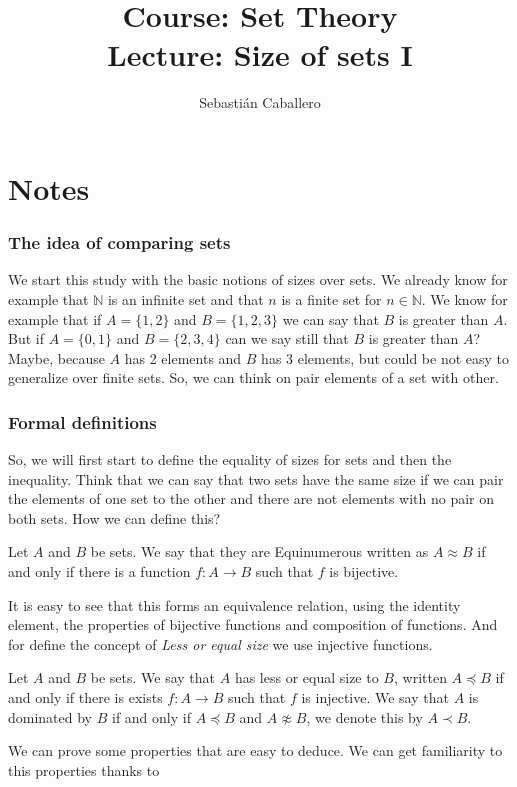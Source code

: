 \documentclass{tufte-handout}
\title{Course: Set Theory \\ \Large Lecture: Size of sets I}
\author{Sebastián Caballero}
\begin{document}
\maketitle



\part*{Notes}
\section{The idea of comparing sets}
We start this study with the basic notions of sizes over sets. We already know for example that $\mathbb{N}$ is an infinite set and that $n$ is a finite set for $n \in \mathbb{N}$. We know for example that if $A = \{1, 2\}$ and $B = \{1, 2, 3\}$ we can say that $B$ is greater than $A$. \\

But if $A = \{0, 1\}$ and $B = \{2, 3, 4\}$ can we say still that $B$ is greater than $A$? Maybe, because $A$ has 2 elements and $B$ has $3$ elements, but could be not easy to generalize over finite sets. So, we can think on pair elements of a set with other.

\section{Formal definitions}
So, we will first start to define the equality of sizes for sets and then the inequality. Think that we can say that two sets have the same size if we can pair the elements of one set to the other and there are not elements with no pair on both sets. How we can define this?

\begin{definition}
	Let $A$ and $B$ be sets. We say that they are Equinumerous written as $A \approx B$ if and only if there is a function $f: A \to B$ such that $f$ is bijective.
\end{definition}

It is easy to see that this forms an equivalence relation, using the identity element, the properties of bijective functions and composition of functions. And for define the concept of \textit{Less or equal size} we use injective functions.

\begin{definition}
	Let $A$ and $B$ be sets. We say that $A$ has less or equal size to $B$, written $A \preceq B$ if and only if there is exists $f: A \to B$ such that $f$ is injective. We say that $A$ is dominated by $B$ if and only if $A \preceq B$ and $A \not \approx B$, we denote this by $A \prec B$. 
\end{definition}

We can prove some properties that are easy to deduce. We can get familiarity to this properties thanks to 
\end{document}
